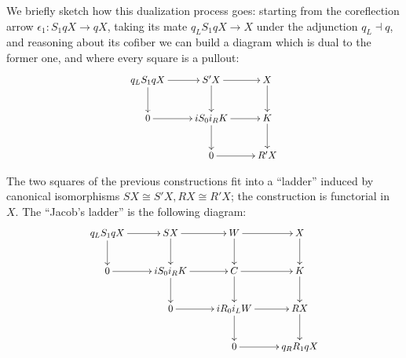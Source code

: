 We briefly sketch how this dualization process goes: starting from the coreflection arrow $\epsilon_1 \colon S_1qX\to qX$, taking its mate $q_LS_1 qX\to X$ under the adjunction $q_L\dashv q$, and reasoning about its cofiber we can build a diagram which is dual to the former one, and where every square is a pullout:
\[\label{twostar}
\scalebox{.9}{\xymatrix{
                q_L S_1 q X	& S'X	& X \\
                0	& i S_0 i_R K	& K \\
                	& 0	& R'X
                \ar "1,1";"1,2" 
                \ar "1,1";"2,1" 
                \ar "1,2";"1,3" 
                \ar "1,2";"2,2" 
                \ar "1,3";"2,3" 
                \ar "2,1";"2,2" 
                \ar "2,2";"2,3" 
                \ar "2,2";"3,2" 
                \ar "2,3";"3,3" 
                \ar "3,2";"3,3" 
              }}
\]
\begin{proposition}\label{thejacbo}
The two squares of the previous constructions fit into a ``ladder'' induced by canonical isomorphisms $SX\cong S'X, RX\cong R'X$; the construction is functorial in $X$. The ``Jacob's ladder'' is the following diagram:
\[\label{ladder:objs}
\scalebox{.9}{\xymatrix{
                q_L S_1 qX	& SX	& W	& X \\
                0	& iS_0 i_R K	& C	& K \\
                	& 0	& i R_0 i_L W	& RX \\
                	& 	& 0	& q_R R_1 q X
                \ar "1,1";"1,2" 
                \ar "1,1";"2,1" 
                \ar "1,2";"1,3" 
                \ar "1,2";"2,2" 
                \ar "1,3";"1,4" 
                \ar "1,3";"2,3" 
                \ar "1,4";"2,4" 
                \ar "2,1";"2,2" 
                \ar "2,2";"2,3" 
                \ar "2,2";"3,2" 
                \ar "2,3";"2,4" 
                \ar "2,3";"3,3" 
                \ar "2,4";"3,4" 
                \ar "3,2";"3,3" 
                \ar "3,3";"3,4" 
                \ar "3,3";"4,3" 
                \ar "3,4";"4,4" 
                \ar "4,3";"4,4" 
              }}
\]
\end{proposition}
